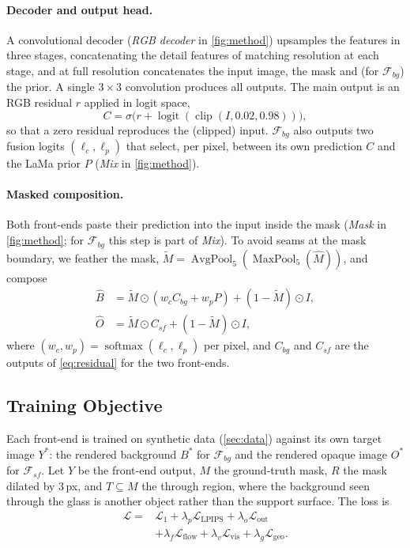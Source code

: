 \paragraph{Decoder and output head.}
A convolutional decoder (\emph{RGB decoder} in \cref{fig:method}) upsamples the features in three stages, concatenating the detail features of matching resolution at each stage, and at full resolution concatenates the input image, the mask and (for $\mathcal{F}_{bg}$) the prior.
A single $3{\times}3$ convolution produces all outputs.
The main output is an RGB residual $r$ applied in logit space,
\begin{equation}
  C = \sigma\big(r + \operatorname{logit}(\operatorname{clip}(I, 0.02, 0.98))\big),
  \label{eq:residual}
\end{equation}
so that a zero residual reproduces the (clipped) input.
$\mathcal{F}_{bg}$ also outputs two fusion logits $(\ell_c, \ell_p)$ that select, per pixel, between its own prediction $C$ and the LaMa prior $P$ (\emph{Mix} in \cref{fig:method}).

\paragraph{Masked composition.}
Both front-ends paste their prediction into the input inside the mask (\emph{Mask} in \cref{fig:method}; for $\mathcal{F}_{bg}$ this step is part of \emph{Mix}).
To avoid seams at the mask boundary, we feather the mask, $\tilde M = \operatorname{AvgPool}_5(\operatorname{MaxPool}_5(\hat M))$, and compose
\begin{align}
  \hat B &= \tilde M \odot (w_c C_{bg} + w_p P) + (1 - \tilde M) \odot I, \label{eq:compose-bg} \\
  \hat O &= \tilde M \odot C_{sf} + (1 - \tilde M) \odot I, \label{eq:compose-sf}
\end{align}
where $(w_c, w_p) = \operatorname{softmax}(\ell_c, \ell_p)$ per pixel, and $C_{bg}$ and $C_{sf}$ are the outputs of \cref{eq:residual} for the two front-ends.

\subsection{Training Objective}
\label{sec:training}

Each front-end is trained on synthetic data (\cref{sec:data}) against its own target image $Y^*$: the rendered background $B^*$ for $\mathcal{F}_{bg}$ and the rendered opaque image $O^*$ for $\mathcal{F}_{sf}$.
Let $\hat Y$ be the front-end output, $M$ the ground-truth mask, $R$ the mask dilated by 3\,px, and $T \subseteq M$ the through region, where the background seen through the glass is another object rather than the support surface.
The loss is
\begin{equation}
  \begin{split}
  \mathcal{L} = {}&\mathcal{L}_{1} + \lambda_{p}\mathcal{L}_{\mathrm{LPIPS}} + \lambda_{o}\mathcal{L}_{\mathrm{out}} \\
  &+ \lambda_{f}\mathcal{L}_{\mathrm{flow}} + \lambda_{v}\mathcal{L}_{\mathrm{vis}} + \lambda_{g}\mathcal{L}_{\mathrm{geo}}.
  \end{split}
  \label{eq:loss}
\end{equation}


